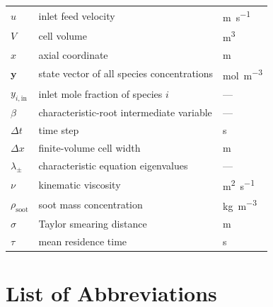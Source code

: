 \begin{longtable}{@{} p{} p{} p{} @{}}
\(u\)                   & inlet feed velocity                                               & \si{\metre\per\second}                              \\
\(V\)                   & cell volume                                                       & \si{\cubic\metre}                                   \\
\(x\)                   & axial coordinate                                                  & \si{\metre}                                         \\
\(\mathbf{y}\)          & state vector of all species concentrations                        & \si{\mole\per\cubic\metre}                          \\
\(y_{i,\mathrm{in}}\)   & inlet mole fraction of species \(i\)                              & ---                                                 \\
\(\beta\)               & characteristic-root intermediate variable                         & ---                                                 \\
\(\Delta t\)            & time step                                                         & \si{\second}                                        \\
\(\Delta x\)            & finite-volume cell width                                          & \si{\metre}                                         \\
\(\lambda_\pm\)         & characteristic equation eigenvalues                               & ---                                                 \\
\(\nu\)                 & kinematic viscosity                                               & \si{\square\metre\per\second}                       \\
\(\rho_{\mathrm{soot}}\)& soot mass concentration                                           & \si{\kilo\gram\per\cubic\metre}                     \\
\(\sigma\)              & Taylor smearing distance                                          & \si{\metre}                                         \\
\(\tau\)                & mean residence time                                               & \si{\second}                                        \\
\end{longtable}

\chapter*{List of Abbreviations}

